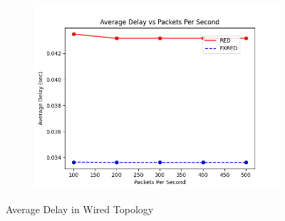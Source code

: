 \documentclass[10pt]{report}
\begin{document}
\begin{figure}
    \begin{subfigure}{.5\textwidth}
        \includegraphics[width=1\linewidth]{static/graphs/wired/Average Delay vs Packets Per Second.png}
    \end{subfigure}
    \caption{Average Delay in Wired Topology}
    \label{fig:wired_avg_delay}
\end{figure}
\end{document}
